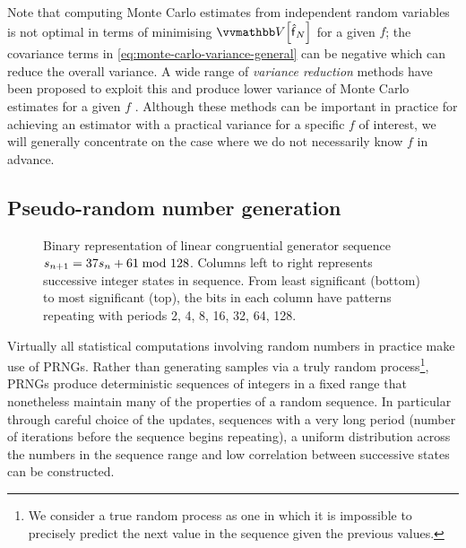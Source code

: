 Note that computing Monte Carlo estimates from independent random variables is not optimal in terms of minimising $\var{\hatf_N}$ for a given $f$; the covariance terms in \eqref{eq:monte-carlo-variance-general} can be negative which can reduce the overall variance. A wide range of \emph{variance reduction} methods have been proposed to exploit this and produce lower variance of Monte Carlo estimates for a given $f$ \citep{kroese2011variance}. Although these methods can be important in practice for achieving an estimator with a practical variance for a specific $f$ of interest, we will generally concentrate on the case where we do not necessarily know $f$ in advance. %

\subsection{Pseudo-random number generation}

\begin{figure}
\centering
{}
\drawgrid[zero color=black!80, one color=Maroon, cell ht=0.22em, cell wd=0.22em]{\lcgfile}
\caption[Example linear congruential generator sequence.]{Binary representation of linear congruential generator sequence $s_{n+1} = 37s_n + 61 \kern-4pt\mod 128$. Columns left to right represents successive integer states in sequence. From least significant (bottom) to most significant (top), the bits in each column have patterns repeating with periods 2, 4, 8, 16, 32, 64, 128.}
\label{fig:example-lcg-sequence}
\end{figure}

Virtually all statistical computations involving random numbers in practice make use of \acp{PRNG}. Rather than generating samples via a truly random process\footnote{We consider a true random process as one in which it is impossible to precisely predict the next value in the sequence given the previous values.}, \acp{PRNG} produce deterministic sequences of integers in a fixed range that nonetheless maintain many of the properties of a random sequence. In particular through careful choice of the updates, sequences with a very long period (number of iterations before the sequence begins repeating), a uniform distribution across the numbers in the sequence range and low correlation between successive states can be constructed. 

